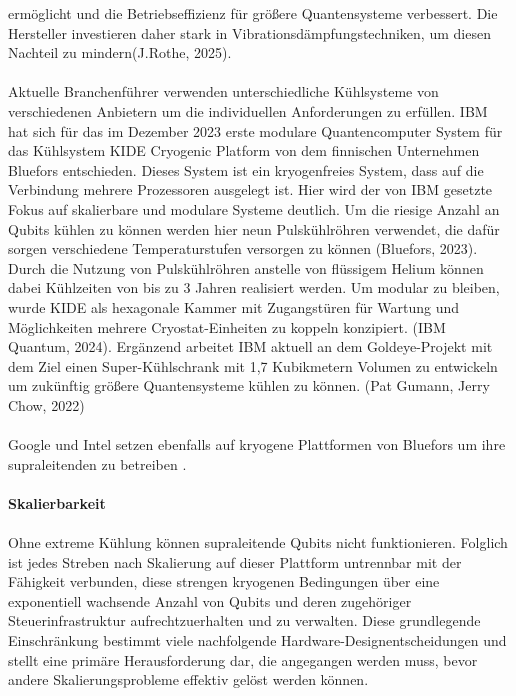 ermöglicht und die Betriebseffizienz für größere Quantensysteme verbessert. Die Hersteller investieren daher stark in Vibrationsdämpfungstechniken, um diesen Nachteil zu mindern(J.Rothe, 2025).
\\\\
Aktuelle Branchenführer verwenden unterschiedliche Kühlsysteme von verschiedenen Anbietern um die individuellen Anforderungen zu erfüllen. IBM hat sich für das im Dezember 2023 erste modulare Quantencomputer System für das Kühlsystem \glqq KIDE Cryogenic Platform\grqq{} von dem finnischen Unternehmen Bluefors entschieden. Dieses System ist ein kryogenfreies System, dass auf die Verbindung mehrere Prozessoren ausgelegt ist. Hier wird der von IBM gesetzte Fokus auf skalierbare und modulare Systeme deutlich. Um die riesige Anzahl an Qubits kühlen zu können werden hier neun Pulskühlröhren verwendet, die dafür sorgen verschiedene Temperaturstufen versorgen zu können (Bluefors, 2023). Durch die Nutzung von Pulskühlröhren anstelle von flüssigem Helium können dabei Kühlzeiten von bis zu 3 Jahren realisiert werden. Um modular zu bleiben, wurde KIDE als hexagonale Kammer mit Zugangstüren für Wartung und Möglichkeiten mehrere Cryostat-Einheiten zu koppeln konzipiert. (IBM Quantum, 2024). Ergänzend arbeitet IBM aktuell an dem Goldeye-Projekt mit dem Ziel einen \glqq Super-Kühlschrank\grqq{} mit 1,7 Kubikmetern Volumen zu entwickeln um zukünftig größere Quantensysteme kühlen zu können. (Pat Gumann, Jerry Chow, 2022)\\\\
Google und Intel setzen ebenfalls auf kryogene Plattformen von Bluefors um ihre supraleitenden zu betreiben \cite{noauthor_cryogenic_2025}.
\\\\
\textbf{Skalierbarkeit}\\\\
Ohne extreme Kühlung können supraleitende Qubits nicht funktionieren. Folglich ist jedes Streben nach Skalierung auf dieser Plattform untrennbar mit der Fähigkeit verbunden, diese strengen kryogenen Bedingungen über eine exponentiell wachsende Anzahl von Qubits und deren zugehöriger Steuerinfrastruktur aufrechtzuerhalten und zu verwalten. Diese grundlegende Einschränkung bestimmt viele nachfolgende Hardware-Designentscheidungen und stellt eine primäre Herausforderung dar, die angegangen werden muss, bevor andere Skalierungsprobleme effektiv gelöst werden können.\\\\
